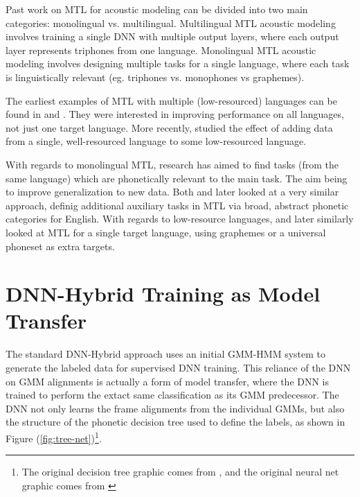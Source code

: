 \documentclass[a4paper]{article}
\begin{document}
Past work on MTL for acoustic modeling can be divided into two main categories: monolingual vs. multilingual. Multilingual MTL acoustic modeling involves training a single DNN with multiple output layers, where each output layer represents triphones from one language. Monolingual MTL acoustic modeling involves designing multiple tasks for a single language, where each task is linguistically relevant (eg. triphones vs. monophones vs graphemes).

The earliest examples of MTL with multiple (low-resourced) languages can be found in \cite{huang2013} and \cite{heigold2013}. They were interested in improving performance on all languages, not just one target language. More recently, \cite{grezl2016} studied the effect of adding data from a single, well-resourced language to some low-resourced language.

With regards to monolingual MTL, research has aimed to find tasks (from the same language) which are phonetically relevant to the main task. The aim being to improve generalization to new data. Both \cite{seltzer2013} and later \cite{huang2015} looked at a very similar approach, definig additional auxiliary tasks in MTL via broad, abstract phonetic categories for English. With regards to low-resource languages, \cite{chen2014} and later \cite{chen2015} similarly looked at MTL for a single target language, using graphemes or a universal phoneset as extra targets.



\section{DNN-Hybrid Training as Model Transfer}

The standard DNN-Hybrid approach uses an initial GMM-HMM system to generate the labeled data for supervised DNN training. This reliance of the DNN on GMM alignments is actually a form of model transfer, where the DNN is trained to perform the extact same classification as its GMM predecessor. The DNN not only learns the frame alignments from the individual GMMs, but also the structure of the phonetic decision tree used to define the labels, as shown in Figure (\ref{fig:tree-net})\footnote{The original decision tree graphic comes from \cite{young2002}, and the original neural net graphic comes from \cite{heigold2013}}.
\end{document}
